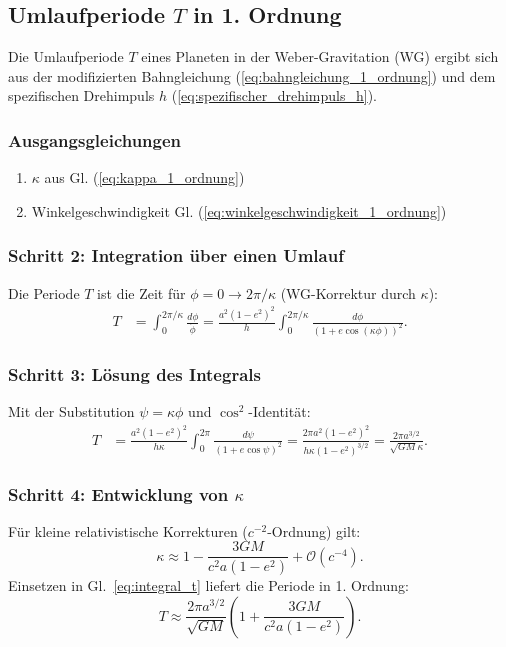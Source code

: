 \newpage
\subsection{Umlaufperiode $T$ in 1. Ordnung}
Die Umlaufperiode $T$ eines Planeten in der Weber-Gravitation (WG) ergibt sich aus der modifizierten Bahngleichung (\ref{eq:bahngleichung_1_ordnung}) und dem spezifischen Drehimpuls $h$ (\ref{eq:spezifischer_drehimpuls_h}).

\subsubsection*{Ausgangsgleichungen}
\begin{enumerate}
    \item $\kappa$ aus Gl. (\ref{eq:kappa_1_ordnung})
    \item Winkelgeschwindigkeit Gl. (\ref{eq:winkelgeschwindigkeit_1_ordnung})
\end{enumerate}

\subsubsection*{Schritt 2: Integration über einen Umlauf}
Die Periode $T$ ist die Zeit für $\phi = 0 \to 2\pi/\kappa$ (WG-Korrektur durch $\kappa$):
\begin{align}
    T &= \int_0^{2\pi/\kappa} \frac{d\phi}{\dot{\phi}} 
       = \frac{a^2(1-e^2)^2}{h} \int_0^{2\pi/\kappa} \frac{d\phi}{(1 + e \cos(\kappa \phi))^2}.
\end{align}

\subsubsection*{Schritt 3: Lösung des Integrals}
Mit der Substitution $\psi = \kappa \phi$ und $\cos^2$-Identität:
\begin{align}
\label{eq:integral_t}
    T &= \frac{a^2(1-e^2)^2}{h \kappa} \int_0^{2\pi} \frac{d\psi}{(1 + e \cos \psi)^2} 
       = \frac{2\pi a^2(1-e^2)^2}{h \kappa (1-e^2)^{3/2}} 
       = \frac{2\pi a^{3/2}}{\sqrt{GM} \kappa}.
\end{align}

\subsubsection*{Schritt 4: Entwicklung von $\kappa$}
Für kleine relativistische Korrekturen ($c^{-2}$-Ordnung) gilt:
\begin{equation}
    \kappa \approx 1 - \frac{3GM}{c^2 a(1-e^2)} + \mathcal{O}(c^{-4}).
\end{equation}
Einsetzen in Gl.~\eqref{eq:integral_t} liefert die Periode in 1. Ordnung:
\begin{equation}
    \boxed{
    T \approx \frac{2\pi a^{3/2}}{\sqrt{GM}} \left(1 + \frac{3GM}{c^2 a(1-e^2)}\right).
    }
\end{equation}

